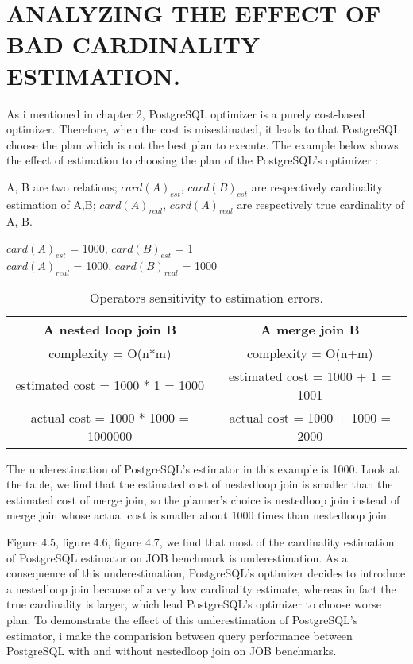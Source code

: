 \section{ANALYZING THE EFFECT OF BAD CARDINALITY ESTIMATION.} 
{\justify
As i mentioned in chapter 2, PostgreSQL optimizer is a purely cost-based optimizer. Therefore, when the cost is misestimated, it  leads to that PostgreSQL choose the plan which is not the best plan to execute. The example below shows the effect of estimation to choosing the plan of the PostgreSQL's optimizer :
\begin{itemize}
{
\item A, B are two relations; $card\left(A\right)_{est}$, $card\left(B\right)_{est}$ are respectively cardinality estimation of A,B; $card\left(A\right)_{real}$, $card\left(A\right)_{real}$ are respectively true cardinality of A, B.
\par }
{\centering $card\left(A\right)_{est}$ = 1000, $card\left(B\right)_{est}$ = 1 \\
$card\left(A\right)_{real}$ = 1000, $card\left(B\right)_{real}$ =  1000\\
}
\newpage
\begin{table}[ht]
\begin{center}
\begin{tabular}{|c|c|}
\hline
A nested loop join B  & A merge join B\\
\hline
complexity = O(n*m) & complexity = O(n+m)\\
\hline 
estimated cost = 1000 * 1 = 1000 & estimated cost = 1000 + 1 = 1001\\ 
\hline 
actual cost = 1000 * 1000 = 1000000 & actual cost = 1000 + 1000 = 2000\\ 
\hline 
\end{tabular}
\end{center}
\label{tab:dum1}
\caption{Operators sensitivity to estimation errors.}
\end{table}
{\justify
The underestimation of PostgreSQL's estimator in this example is 1000. Look at the table, we find that the estimated cost of nestedloop join is smaller than the estimated cost of merge join, so the planner's choice is nestedloop join instead of merge join whose actual cost is smaller about 1000 times than nestedloop join. 
\par}
\end{itemize}
\par}
{\justify
Figure 4.5, figure 4.6, figure 4.7, we find that most of the cardinality estimation of PostgreSQL estimator on JOB benchmark is underestimation. As a consequence of this underestimation, PostgreSQL's optimizer decides to introduce a nestedloop join because of a very low cardinality estimate, whereas in fact the true cardinality is larger, which lead PostgreSQL's optimizer to choose worse plan. To demonstrate the effect of this underestimation of PostgreSQL's estimator, i make the comparision between query performance between PostgreSQL with and without nestedloop join on JOB benchmarks. 
\par}
